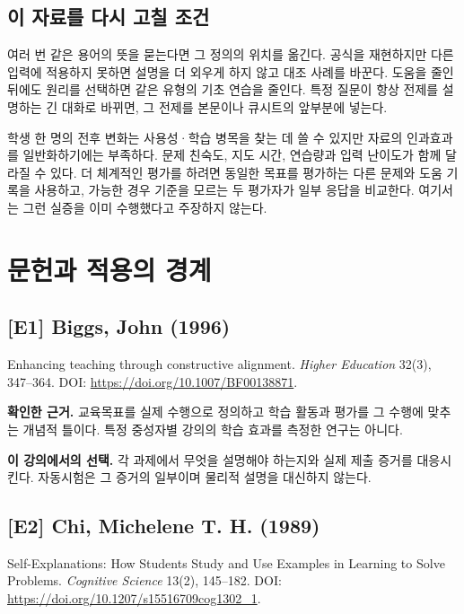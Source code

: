 \documentclass[
  10pt,
  a4paper,
]{article}
\begin{document}
\subsection{이 자료를 다시 고칠
조건}\label{uxc774-uxc790uxb8ccuxb97c-uxb2e4uxc2dc-uxace0uxce60-uxc870uxac74}

여러 번 같은 용어의 뜻을 묻는다면 그 정의의 위치를 옮긴다. 공식을
재현하지만 다른 입력에 적용하지 못하면 설명을 더 외우게 하지 않고 대조
사례를 바꾼다. 도움을 줄인 뒤에도 원리를 선택하면 같은 유형의 기초
연습을 줄인다. 특정 질문이 항상 전제를 설명하는 긴 대화로 바뀌면, 그
전제를 본문이나 큐시트의 앞부분에 넣는다.

학생 한 명의 전후 변화는 사용성·학습 병목을 찾는 데 쓸 수 있지만 자료의
인과효과를 일반화하기에는 부족하다. 문제 친숙도, 지도 시간, 연습량과
입력 난이도가 함께 달라질 수 있다. 더 체계적인 평가를 하려면 동일한
목표를 평가하는 다른 문제와 도움 기록을 사용하고, 가능한 경우 기준을
모르는 두 평가자가 일부 응답을 비교한다. 여기서는 그런 실증을 이미
수행했다고 주장하지 않는다.

\section{문헌과 적용의
경계}\label{uxbb38uxd5ccuxacfc-uxc801uxc6a9uxc758-uxacbduxacc4}

\subsection{{[}E1{]} Biggs, John (1996)}\label{e1-biggs-john-1996}

Enhancing teaching through constructive alignment. \emph{Higher
Education} 32(3), 347--364. DOI:
\url{https://doi.org/10.1007/BF00138871}.

\textbf{확인한 근거.} 교육목표를 실제 수행으로 정의하고 학습 활동과
평가를 그 수행에 맞추는 개념적 틀이다. 특정 중성자별 강의의 학습 효과를
측정한 연구는 아니다.

\textbf{이 강의에서의 선택.} 각 과제에서 무엇을 설명해야 하는지와 실제
제출 증거를 대응시킨다. 자동시험은 그 증거의 일부이며 물리적 설명을
대신하지 않는다.

\subsection{{[}E2{]} Chi, Michelene T. H.
(1989)}\label{e2-chi-michelene-t.-h.-1989}

Self-Explanations: How Students Study and Use Examples in Learning to
Solve Problems. \emph{Cognitive Science} 13(2), 145--182. DOI:
\url{https://doi.org/10.1207/s15516709cog1302_1}.
\end{document}
